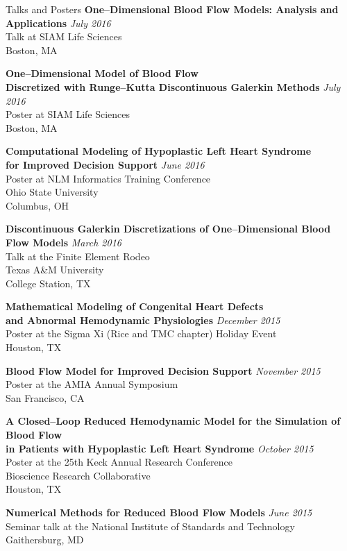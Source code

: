 \documentclass{resume} %
\begin{document}
\begin{rSection}{Talks and Posters}
{\bf One--Dimensional Blood Flow Models: Analysis and Applications} \hfill{\em July 2016}\\
{\small Talk at SIAM Life Sciences \\
Boston, MA}

{\bf One--Dimensional Model of Blood Flow \\ Discretized with Runge--Kutta Discontinuous Galerkin Methods} \hfill{\em July 2016}\\
{\small Poster at SIAM Life Sciences \\
Boston, MA}

{\bf Computational Modeling of Hypoplastic Left Heart Syndrome \\ for Improved Decision Support} \hfill{\em June 2016}\\
{\small Poster at NLM Informatics Training Conference \\
Ohio State University \\
Columbus, OH}

{\bf Discontinuous Galerkin Discretizations of One--Dimensional Blood Flow Models} \hfill{\em March 2016}\\
{\small Talk at the Finite Element Rodeo \\
Texas A\&M University \\
College Station, TX}

{\bf Mathematical Modeling of Congenital Heart Defects \\ and Abnormal Hemodynamic Physiologies} \hfill{\em December 2015}\\
{\small Poster at the Sigma Xi (Rice and TMC chapter) Holiday Event\\
Houston, TX}

{\bf Blood Flow Model for Improved Decision Support} \hfill{\em November 2015}\\
{\small Poster at the AMIA Annual Symposium\\
San Francisco, CA}

{\bf A Closed--Loop Reduced Hemodynamic Model for the Simulation of Blood Flow \\in Patients with Hypoplastic Left Heart Syndrome} \hfill{\em October 2015}\\
{\small Poster at the 25th Keck Annual Research Conference\\
Bioscience Research Collaborative \\
Houston, TX}

{\bf Numerical Methods for Reduced Blood Flow Models} \hfill{\em June 2015}\\
{\small Seminar talk at the National Institute of Standards and Technology\\
Gaithersburg, MD}


\end{rSection}
\end{document}
